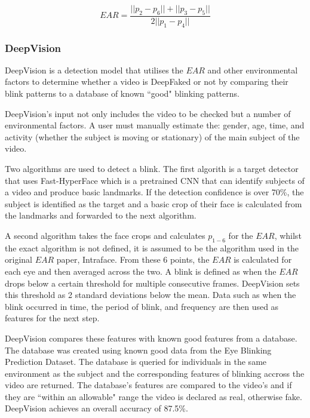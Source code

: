 \begin{equation}
    \label{eq:ear}
    EAR=\frac{||p_2-p_6|| + ||p_3-p_5||}{2||p_1-p_4||}
\end{equation}

\subsubsection{DeepVision}

DeepVision\cite{jung2020deepvision} is a detection model that utilises the $EAR$ and other environmental factors to determine whether a video is DeepFaked or not by comparing their blink patterns to a database of known ``good" blinking patterns.

DeepVision's input not only includes the video to be checked but a number of environmental factors. A user must manually estimate the: gender, age, time, and activity (whether the subject is moving or stationary) of the main subject of the video. 

Two algorithms are used to detect a blink. The first algorith is a target detector that uses Fast-HyperFace\cite{ranjan2017hyperface} which is a pretrained CNN that can identify subjects of a video and produce basic landmarks. If the detection confidence is over 70\%, the subject is identified as the target and a basic crop of their face is calculated from the landmarks and forwarded to the next algorithm.

A second algorithm takes the face crops and calculates $p_{1-6}$ for the $EAR$, whilst the exact algorithm is not defined, it is assumed to be the algorithm used in the original $EAR$ paper, Intraface\cite{xiong2013supervised}. From these 6 points, the $EAR$ is calculated for each eye and then averaged across the two. A blink is defined as when the $EAR$ drops below a certain threshold for multiple consecutive frames. DeepVision sets this threshold as 2 standard deviations below the mean. Data such as when the blink occurred in time, the period of blink, and frequency are then used as features for the next step.

DeepVision compares these features with known good features from a database. The database was created using known good data from the Eye Blinking Prediction Dataset\cite{turing2018eye}. The database is queried for individuals in the same environment as the subject and the corresponding features of blinking accross the video are returned. The database's features are compared to the video's and if they are ``within an allowable" range the video is declared as real, otherwise fake. DeepVision achieves an overall accuracy of 87.5\%.

